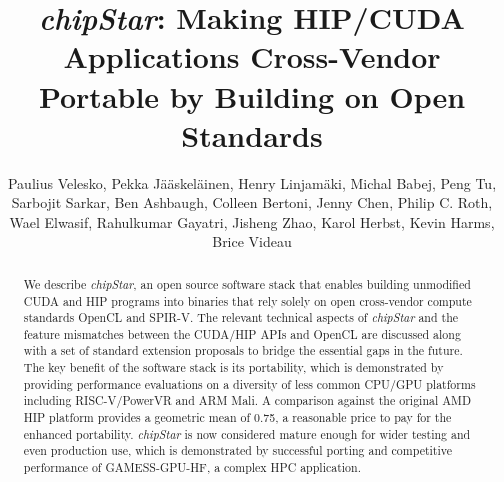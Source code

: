 \documentclass[Afour,sageh,times]{sagej}
\newcommand{\chipstar}{\textit{chipStar}\xspace}
\begin{document}

\title{\chipstar: Making HIP/CUDA Applications Cross-Vendor Portable by Building on Open Standards}

\author{
{Paulius Velesko},
{Pekka Jääskeläinen},
{Henry Linjamäki},
{Michal Babej},
{Peng Tu},
{Sarbojit Sarkar},
{Ben Ashbaugh},
{Colleen Bertoni},
{Jenny Chen},
{Philip C. Roth},
{Wael Elwasif},
{Rahulkumar Gayatri},
{Jisheng Zhao},
{Karol Herbst},
{Kevin Harms},
{Brice Videau}}






\begin{abstract}
We describe \chipstar, an open source software stack that enables building unmodified CUDA and HIP programs into binaries that rely solely on open cross-vendor compute standards OpenCL and SPIR-V. The relevant technical aspects of \chipstar and the feature mismatches between the CUDA/HIP APIs and OpenCL are discussed along with a set of standard extension proposals to bridge the essential gaps in the future.
The key benefit of the software stack is its portability, which is demonstrated by providing performance evaluations on a diversity of less common CPU/GPU platforms including RISC-V/PowerVR and ARM Mali. A comparison against the original AMD HIP platform provides a geometric mean of 0.75, a reasonable price to pay for the enhanced portability.    
\chipstar is now considered mature enough for wider testing and even production use, which is demonstrated by successful porting and competitive performance of GAMESS-GPU-HF, a complex HPC application.

\end{abstract}

\end{document}
